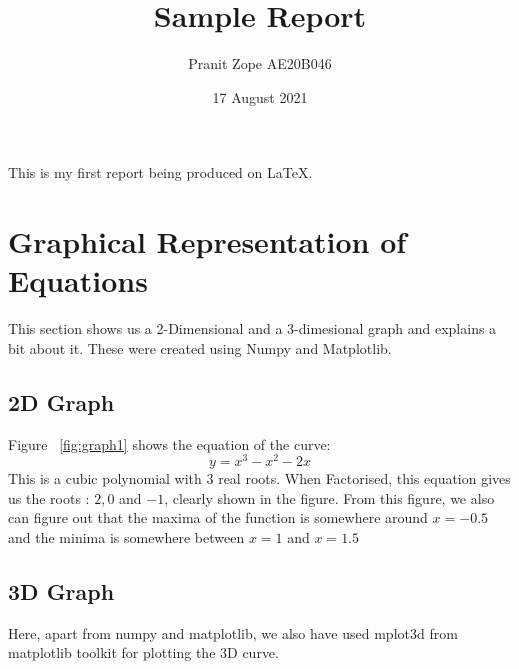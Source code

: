 \documentclass{article}
\title{Sample Report}
\author{Pranit Zope AE20B046}
\date{17 August 2021}
\begin{document}
\maketitle
This is my first report being produced on \LaTeX. 

\section{Graphical Representation of Equations}
This section shows us a 2-Dimensional and a 3-dimesional graph and explains a bit about it. These were created using Numpy and Matplotlib.
\subsection{2D Graph}

\begin{figure}[!h]
\centering
{}
\label{fig:graphs}
\end{figure}


Figure ~\ref{fig:graph1} shows the equation of the curve:
\begin{equation}y = x^3-x^2-2x\end{equation}
This is a cubic polynomial with 3 real roots. When Factorised, this equation gives us the roots : $2,0$ and $-1$, clearly shown in the figure. From this figure, we also can figure out that the maxima of the function is somewhere around $x=-0.5$ and the minima is somewhere between $x=1$ and $x=1.5$
\pagebreak

\subsection{3D Graph}
Here, apart from numpy and matplotlib, we also have used mplot3d from matplotlib toolkit for plotting the 3D curve.
\end{document}
